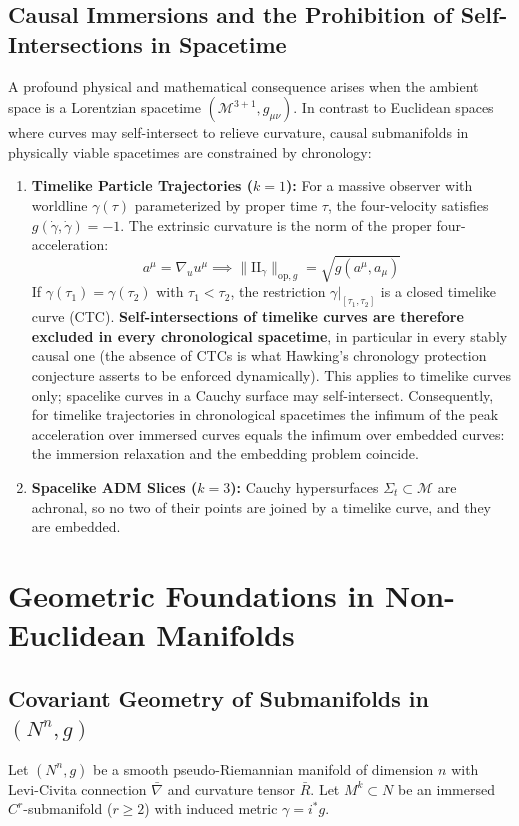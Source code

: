\documentclass[11pt,reqno]{amsart}
\theoremstyle{definition}
\providecommand{\II}{\mathrm{I\!I}}
\newcommand{\op}{\mathrm{op}}
\numberwithin{equation}{section}
\providecommand{\II}{\mathrm{II}}
\begin{document}
\subsection{Causal Immersions and the Prohibition of Self-Intersections in Spacetime}
\label{subsec:causality_self_intersection}
A profound physical and mathematical consequence arises when the ambient space is a Lorentzian spacetime $(\mathcal{M}^{3+1}, g_{\mu\nu})$. In contrast to Euclidean spaces where curves may self-intersect to relieve curvature, causal submanifolds in physically viable spacetimes are constrained by chronology:
\begin{enumerate}
    \item \textbf{Timelike Particle Trajectories ($k=1$):} For a massive observer with worldline $\gamma(\tau)$ parameterized by proper time $\tau$, the four-velocity satisfies $g(\dot{\gamma}, \dot{\gamma}) = -1$. The extrinsic curvature is the norm of the proper four-acceleration:
    \begin{equation}
    a^\mu = \nabla_u u^\mu \implies \|\II_\gamma\|_{\op, g} = \sqrt{g(a^\mu, a_\mu)}
    \end{equation}
    If $\gamma(\tau_1) = \gamma(\tau_2)$ with $\tau_1 < \tau_2$, the restriction $\gamma|_{[\tau_1,\tau_2]}$ is a closed timelike curve (CTC). \textbf{Self-intersections of timelike curves are therefore excluded in every chronological spacetime}, in particular in every stably causal one (the absence of CTCs is what Hawking's chronology protection conjecture \cite{hawking1992} asserts to be enforced dynamically). This applies to timelike curves only; spacelike curves in a Cauchy surface may self-intersect. Consequently, for timelike trajectories in chronological spacetimes the infimum of the peak acceleration over immersed curves equals the infimum over embedded curves: the immersion relaxation and the embedding problem coincide.
    \item \textbf{Spacelike ADM Slices ($k=3$):} Cauchy hypersurfaces $\Sigma_t \subset \mathcal{M}$ are achronal, so no two of their points are joined by a timelike curve, and they are embedded.
\end{enumerate}

\section{Geometric Foundations in Non-Euclidean Manifolds}

\subsection{Covariant Geometry of Submanifolds in \texorpdfstring{$(N^n, g)$}{(N\textasciicircum n, g)}}
Let $(N^n, g)$ be a smooth pseudo-Riemannian manifold of dimension $n$ with Levi-Civita connection $\bar{\nabla}$ and curvature tensor $\bar{R}$. Let $M^k \subset N$ be an immersed $C^r$-submanifold ($r \ge 2$) with induced metric $\gamma = i^* g$.
\end{document}
